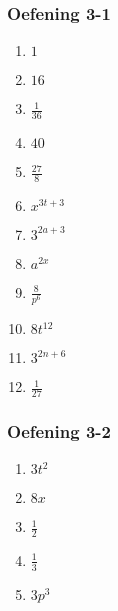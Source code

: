 {\begin{multicols}{3}
  \subsubsection*{Oefening 3-1} %
  \begin{enumerate}[label=\textbf{\arabic*}.,itemsep=1pt]
  \item $1$%
  \item $16$%
  \item $\frac{1}{36}$%
  \item $40$%
  \item $\frac{27}{8}$%
  \item $x^{3t+3}$%
  \item $3^{2a+3}$%
  \item $a^{2x}$%
  \item $\frac{8}{p^6}$%
  \item $8t^{12}$%
  \item $3^{2n+6}$%
  \item $\frac{1}{27}$%
  \end{enumerate}

  \subsubsection*{Oefening 3-2} %
  \begin{enumerate}[label=\textbf{\arabic*}.,itemsep=1pt]
  \item $3t^2$%
  \item $8x$%
  \item $\frac{1}{2}$%
  \item $\frac{1}{3}$%
  \item $3p^3$%
  \end{enumerate}


\end{multicols}}
